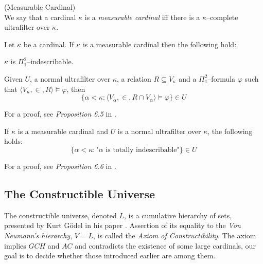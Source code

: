 \begin{definition}{(Measurable Cardinal)}\\
We say that a cardinal $\kappa$ is a \emph{measurable cardinal} iff there is a $\kappa$–complete ultrafilter over $\kappa$.
\end{definition}

\begin{theorem}
Let $\kappa$ be a cardinal. If $\kappa$ is a measurable cardinal then the following hold:
\bce[(i)]
\item $\kappa$ is $\Pi^2_1$–indescribable.
\item Given $U$, a normal ultrafilter over $\kappa$, a relation $R \subseteq V_\kappa$ and a $\Pi^2_1$–formula $\varphi$ such that $\langle V_\kappa, \in, R \rangle \models \varphi$, then
\begin{equation}
\{ \alpha < \kappa : \langle V_\alpha, \in, R \cap V_\alpha \rangle \models \varphi \} \in U
\end{equation}
\ece
\end{theorem}
For a proof, see \emph{Proposition 6.5} in \cite{KanamoriBook}.

\begin{theorem}
If $\kappa$ is a measurable cardinal and $U$ is a normal ultrafilter over $\kappa$, the following holds:
\begin{equation}
\{ \alpha < \kappa: \mbox{"$\alpha$ is totally indescribable"}\} \in U
\end{equation}
\end{theorem}
For a proof, see \emph{Proposition 6.6} in \cite{KanamoriBook}.


\subsection{The Constructible Universe}

The constructible universe, denoted $L$, is a cumulative hierarchy of sets, presented by Kurt Gödel in his paper \cite{Godel1940consistency}.
Assertion of its equality to the \emph{Von Neumann's hierarchy}, $V=L$, is called the \emph{Axiom of Constructibility}. 
The axiom implies $GCH$ and $AC$ and contradicts the existence of some large cardinals, our goal is to decide whether those introduced earlier are among them.

